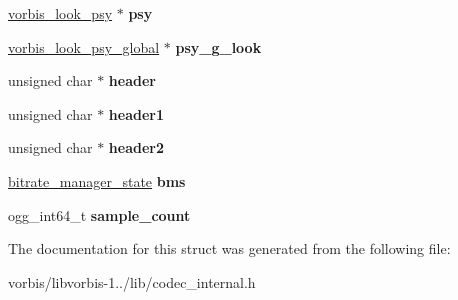 \begin{DoxyCompactItemize}
\item 
\hypertarget{structprivate__state_a26015e60330f92d6d303c0db9c712287}{\hyperlink{structvorbis__look__psy}{vorbis\+\_\+look\+\_\+psy} $\ast$ {\bfseries psy}}\label{structprivate__state_a26015e60330f92d6d303c0db9c712287}

\item 
\hypertarget{structprivate__state_a1e3418326bf4a86cad24212d9af52b3d}{\hyperlink{structvorbis__look__psy__global}{vorbis\+\_\+look\+\_\+psy\+\_\+global} $\ast$ {\bfseries psy\+\_\+g\+\_\+look}}\label{structprivate__state_a1e3418326bf4a86cad24212d9af52b3d}

\item 
\hypertarget{structprivate__state_aa013e7a0c879c920032aea499b4b9473}{unsigned char $\ast$ {\bfseries header}}\label{structprivate__state_aa013e7a0c879c920032aea499b4b9473}

\item 
\hypertarget{structprivate__state_a39269dbce7d1ee96422dd1624df7ac4e}{unsigned char $\ast$ {\bfseries header1}}\label{structprivate__state_a39269dbce7d1ee96422dd1624df7ac4e}

\item 
\hypertarget{structprivate__state_a13f7fdfde42c329aa7d1c088592b3c66}{unsigned char $\ast$ {\bfseries header2}}\label{structprivate__state_a13f7fdfde42c329aa7d1c088592b3c66}

\item 
\hypertarget{structprivate__state_acebfb7e0659bcf6583637bdb74fdfe50}{\hyperlink{structbitrate__manager__state}{bitrate\+\_\+manager\+\_\+state} {\bfseries bms}}\label{structprivate__state_acebfb7e0659bcf6583637bdb74fdfe50}

\item 
\hypertarget{structprivate__state_aac0c7088d58ca406c34b99f653f85d7e}{ogg\+\_\+int64\+\_\+t {\bfseries sample\+\_\+count}}\label{structprivate__state_aac0c7088d58ca406c34b99f653f85d7e}

\end{DoxyCompactItemize}


The documentation for this struct was generated from the following file\+:\begin{DoxyCompactItemize}
\item 
vorbis/libvorbis-\/1../lib/codec\+\_\+internal.\+h\end{DoxyCompactItemize}
